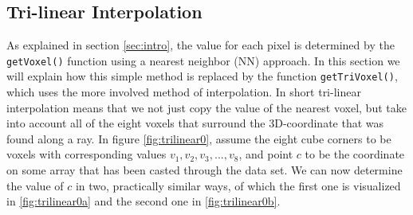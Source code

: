 \subsection{Tri-linear Interpolation}\label{subsec:tri_linear}
As explained in section \ref{sec:intro}, the value for each pixel is determined by the \texttt{getVoxel()} function using a nearest neighbor (NN) approach. In this section we will explain how this simple method is replaced by the function \texttt{getTriVoxel()}, which uses the more involved method of interpolation. In short tri-linear interpolation means that we not just copy the value of the nearest voxel, but take into account all of the eight voxels that surround the 3D-coordinate that was found along a ray. In figure \ref{fig:trilinear0}, assume the eight cube corners to be voxels with corresponding values $v_1, v_2, v_3, ..., v_8$, and point $c$ to be the coordinate on some array that has been casted through the data set. We can now determine the value of $c$ in two, practically similar ways, of which the first one is visualized in \ref{fig:trilinear0a} and the second one in \ref{fig:trilinear0b}.

